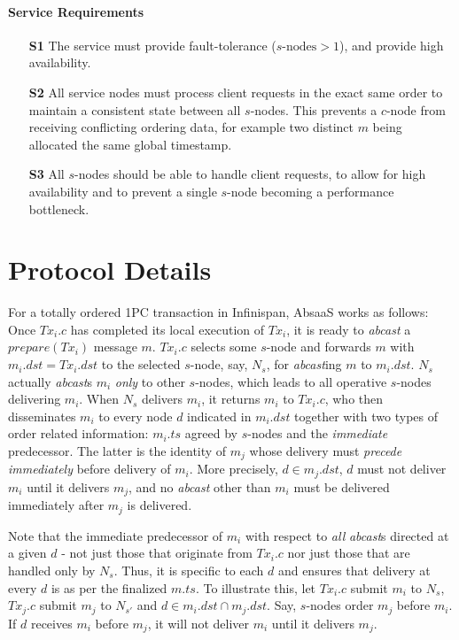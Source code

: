 	\paragraph{Service Requirements} \hspace{0pt}
	\begin{itemize}
		\item [\textbf{S1}] The service must provide fault-tolerance ($s\text{-nodes} > 1$), and provide high availability.  
		
		\item [\textbf{S2}] All service nodes must process client requests in the exact same order to maintain a consistent state between all $s$-nodes.  This prevents a $c$-node from receiving conflicting ordering data, for example two distinct $m$ being allocated the same global timestamp.  
		
		\item [\textbf{S3}] All $s$-nodes should be able to handle client requests, to allow for high availability and to prevent a single $s$-node becoming a performance bottleneck.
	\end{itemize}

\section{Protocol Details}\label{sec:decoupled_protocol}
For a totally ordered 1PC transaction in Infinispan, \textsf{AbsaaS} works as follows: Once $Tx_i.c$ has completed its local execution of $Tx_i$, it is ready to \emph{abcast} a $prepare(Tx_i)$ message $m$.  $Tx_i.c$ selects some $s$-node and forwards $m$ with $m_i.dst = Tx_i.dst$ to the selected $s$-node, say, $N_s$, for \emph{abcast}ing $m$ to $m_i.dst$. $N_s$ actually \emph{abcast}s $m_i$ \emph{only} to other $s$-nodes, which leads to all operative $s$-nodes delivering $m_i$. When $N_s$ delivers $m_i$, it returns $m_i$ to $Tx_i.c$, who then disseminates $m_i$ to every node $d$ indicated in $m_i.dst$ together with two types of order related information: $m_i.ts$ agreed by $s$-nodes and the \emph{immediate} predecessor. The latter is the identity of $m_j$ whose delivery must \emph{precede} \emph{immediately} before delivery of $m_i$. More precisely, $d \in m_j.dst$, $d$ must not deliver $m_i$ until it delivers $m_j$, and no \emph{abcast} other than $m_i$ must be delivered immediately after $m_j$ is delivered.

Note that the immediate predecessor of $m_i$ with respect to \emph{all} \emph{abcast}s directed at a given $d$ - not just those that originate from $Tx_i.c$ nor just those that are handled only by $N_s$. Thus, it is specific to each $d$ and ensures that delivery at every $d$ is as per the finalized $m.ts$. To illustrate this, let $Tx_i.c$ submit $m_i$ to $N_s$, $Tx_j.c$ submit $m_j$ to $N_{s'}$ and $d \in m_i.dst \cap m_j.dst $. Say, $s$-nodes order $m_j$ before $m_i$. If $d$ receives $m_i$ before $m_j$, it will not deliver $m_i$ until it delivers $m_j$.

